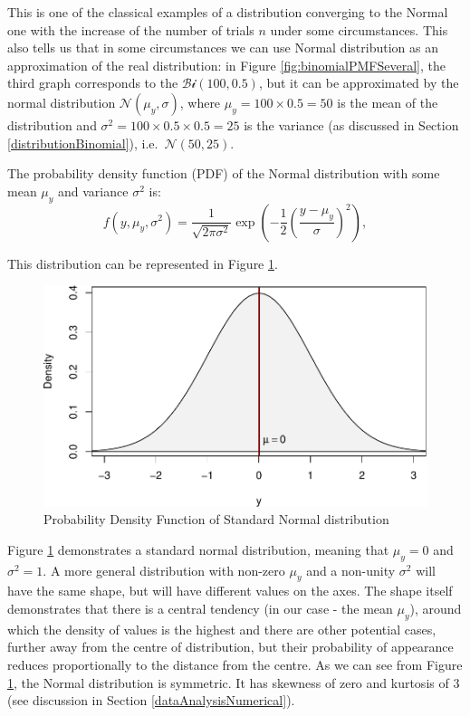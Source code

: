\documentclass[
]{book}
\theoremstyle{definition}
\theoremstyle{definition}
\theoremstyle{definition}
\theoremstyle{definition}
\theoremstyle{remark}
\begin{document}
This is one of the classical examples of a distribution converging to the Normal one with the increase of the number of trials \(n\) under some circumstances. This also tells us that in some circumstances we can use Normal distribution as an approximation of the real distribution: in Figure \ref{fig:binomialPMFSeveral}, the third graph corresponds to the \(\mathcal{Bi}(100, 0.5)\), but it can be approximated by the normal distribution \(\mathcal{N}(\mu_y, \sigma)\), where \(\mu_y=100 \times 0.5 = 50\) is the mean of the distribution and \(\sigma^2 = 100 \times 0.5 \times 0.5 = 25\) is the variance (as discussed in Section \ref{distributionBinomial}), i.e.~\(\mathcal{N}(50, 25)\).

The probability density function (PDF) of the Normal distribution with some mean \(\mu_y\) and variance \(\sigma^2\) is:
\begin{equation}
    f(y, \mu_y, \sigma^2) = \frac{1}{\sqrt{2 \pi \sigma^2}} \exp \left( -\frac{1}{2} \left(\frac{y - \mu_y}{\sigma}\right)^2 \right) ,
    \label{eq:Normal}
\end{equation}

This distribution can be represented in Figure \ref{fig:dnormPlot}.

\begin{figure}
\centering
\includegraphics{Svetunkov---Statistics-for-Business-Analytics_files/figure-latex/dnormPlot-1.pdf}
\caption{\label{fig:dnormPlot}Probability Density Function of Standard Normal distribution}
\end{figure}

Figure \ref{fig:dnormPlot} demonstrates a standard normal distribution, meaning that \(\mu_y=0\) and \(\sigma^2=1\). A more general distribution with non-zero \(\mu_y\) and a non-unity \(\sigma^2\) will have the same shape, but will have different values on the axes. The shape itself demonstrates that there is a central tendency (in our case - the mean \(\mu_y\)), around which the density of values is the highest and there are other potential cases, further away from the centre of distribution, but their probability of appearance reduces proportionally to the distance from the centre. As we can see from Figure \ref{fig:dnormPlot}, the Normal distribution is symmetric. It has skewness of zero and kurtosis of 3 (see discussion in Section \ref{dataAnalysisNumerical}).
\end{document}
